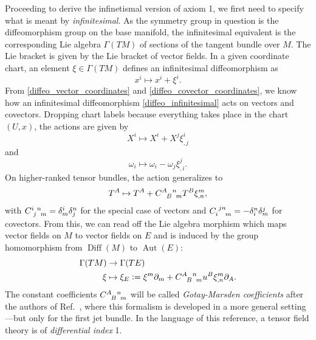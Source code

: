 Proceeding to derive the infinetismal version of axiom 1, we first need to specify what is meant by \emph{infinitesimal}. As the symmetry group in question is the diffeomorphism group on the base manifold, the infinitesimal equivalent is the corresponding Lie algebra $\Gamma(TM)$ of sections of the tangent bundle over $M$. The Lie bracket is given by the Lie bracket of vector fields. In a given coordinate chart, an element $\xi\in\Gamma(TM)$ defines an infinitesimal diffeomorphism as
\begin{equation}\label{diffeo_infinitesimal}
  x^i \mapsto x^i + \xi^i.
\end{equation}
From \eqref{diffeo_vector_coordinates} and \eqref{diffeo_covector_coordinates}, we know how an infinitesimal diffeomorphism \eqref{diffeo_infinitesimal} acts on vectors and covectors. Dropping chart labels because everything takes place in the chart $(U,x)$, the actions are given by
\begin{equation}
  X^i \mapsto X^i + X^j \xi^i_{,j}
\end{equation}
and
\begin{equation}
  \omega_i \mapsto \omega_i - \omega_j \xi^j_{,i}.
\end{equation}
On higher-ranked tensor bundles, the action generalizes to
\begin{equation}
  T^A \mapsto T^A + C^{A\hphantom Bn}_{\hphantom AB\hphantom nm}T^B \xi^m_{,n},
\end{equation}
with $C^{i\hphantom jn}_{\hphantom ij\hphantom nm} = \delta^i_m \delta^n_j$ for the special case of vectors and $C_{i\hphantom{jn}m}^{\hphantom ijn}=-\delta^n_i\delta^j_m$ for covectors. From this, we can read off the Lie algebra morphism which maps vector fields on $M$ to vector fields on $E$ and is induced by the group homomorphism from $\operatorname{Diff}(M)$ to $\operatorname{Aut}(E)$:
\begin{equation}\label{algebra_morphism}
  \begin{aligned}
    \Gamma(TM) &{} \rightarrow \Gamma(TE) \\
    \xi &{} \mapsto \xi_E \vcentcolon= \xi^m\partial_m + C^{A\hphantom Bn}_{\hphantom AB\hphantom nm}u^B \xi^m_{,n} \partial_A.
  \end{aligned}
\end{equation}
The constant coefficients $C^{A\hphantom Bn}_{\hphantom AB\hphantom nm}$ will be called \emph{Gotay-Marsden coefficients} after the authors of Ref.\ \cite{Gotay_1992}, where this formalism is developed in a more general setting---but only for the first jet bundle. In the language of this reference, a tensor field theory is of \emph{differential index} 1.

